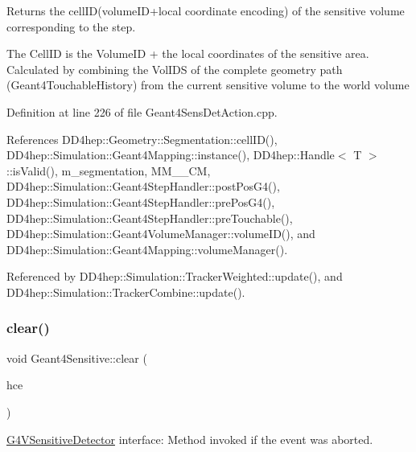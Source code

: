 Returns the cell\+ID(volume\+I\+D+local coordinate encoding) of the sensitive volume corresponding to the step.

The Cell\+ID is the Volume\+ID + the local coordinates of the sensitive area. Calculated by combining the Vol\+I\+DS of the complete geometry path (Geant4\+Touchable\+History) from the current sensitive volume to the world volume 

Definition at line 226 of file Geant4\+Sens\+Det\+Action.\+cpp.



References D\+D4hep\+::\+Geometry\+::\+Segmentation\+::cell\+I\+D(), D\+D4hep\+::\+Simulation\+::\+Geant4\+Mapping\+::instance(), D\+D4hep\+::\+Handle$<$ T $>$\+::is\+Valid(), m\+\_\+segmentation, M\+M\+\_\+\_\+\+CM, D\+D4hep\+::\+Simulation\+::\+Geant4\+Step\+Handler\+::post\+Pos\+G4(), D\+D4hep\+::\+Simulation\+::\+Geant4\+Step\+Handler\+::pre\+Pos\+G4(), D\+D4hep\+::\+Simulation\+::\+Geant4\+Step\+Handler\+::pre\+Touchable(), D\+D4hep\+::\+Simulation\+::\+Geant4\+Volume\+Manager\+::volume\+I\+D(), and D\+D4hep\+::\+Simulation\+::\+Geant4\+Mapping\+::volume\+Manager().



Referenced by D\+D4hep\+::\+Simulation\+::\+Tracker\+Weighted\+::update(), and D\+D4hep\+::\+Simulation\+::\+Tracker\+Combine\+::update().

\hypertarget{class_d_d4hep_1_1_simulation_1_1_geant4_sensitive_a3bb1c2f79261a98e83ec22102281d117}{}\label{class_d_d4hep_1_1_simulation_1_1_geant4_sensitive_a3bb1c2f79261a98e83ec22102281d117} 
\subsubsection{\texorpdfstring{clear()}{clear()}}
{\footnotesize\ttfamily void Geant4\+Sensitive\+::clear (\begin{DoxyParamCaption}\item[{G4\+H\+Cof\+This\+Event $\ast$}]{hce }\end{DoxyParamCaption})\hspace{0.3cm}{\ttfamily [virtual]}}



\hyperlink{class_g4_v_sensitive_detector}{G4\+V\+Sensitive\+Detector} interface\+: Method invoked if the event was aborted. 

